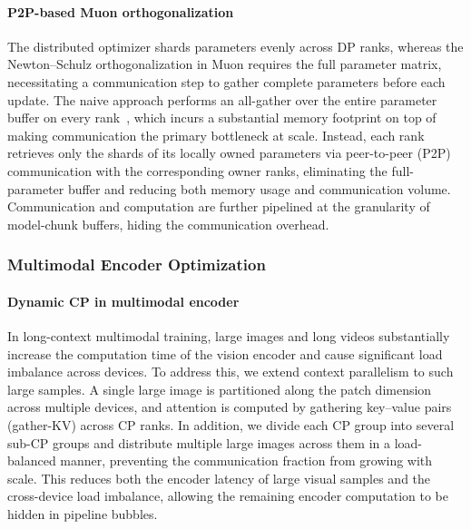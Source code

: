\paragraph{P2P-based Muon orthogonalization}
The distributed optimizer shards parameters evenly across DP ranks, whereas the Newton--Schulz orthogonalization in Muon requires the full parameter matrix, necessitating a communication step to gather complete parameters before each update.
The naive approach performs an all-gather over the entire parameter buffer on every rank~\citep{liu-2025-moonlight}, which incurs a substantial memory footprint on top of making communication the primary bottleneck at scale.
Instead, each rank retrieves only the shards of its locally owned parameters via peer-to-peer (P2P) communication with the corresponding owner ranks, eliminating the full-parameter buffer and reducing both memory usage and communication volume.
Communication and computation are further pipelined at the granularity of model-chunk buffers, hiding the communication overhead.

























\subsubsection{Multimodal Encoder Optimization}
\label{sec:multimodal-encoder-optimization}





\paragraph{Dynamic CP in multimodal encoder}
In long-context multimodal training, large images and long videos substantially increase the computation time of the vision encoder and cause significant load imbalance across devices.
To address this, we extend context parallelism to such large samples.
A single large image is partitioned along the patch dimension across multiple devices, and attention is computed by gathering key--value pairs (gather-KV) across CP ranks.
In addition, we divide each CP group into several sub-CP groups and distribute multiple large images across them in a load-balanced manner, preventing the communication fraction from growing with scale.
This reduces both the encoder latency of large visual samples and the cross-device load imbalance, allowing the remaining encoder computation to be hidden in pipeline bubbles.

